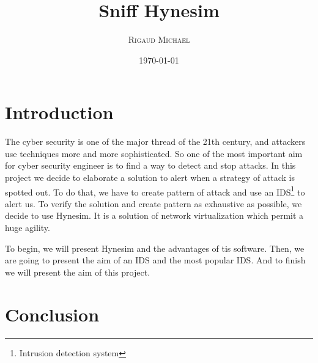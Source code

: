 \documentclass[a4paper, 11pt, oneside, oldfontcommands]{memoir}
\title{Sniff Hynesim}
\author{\textsc{Rigaud Michaël}}
\date{\today}
\newcounter{th}[chapter]
\begin{document}
\maketitle
\thispagestyle{empty}
\newpage

\tableofcontents



\chapter*{Introduction}

The cyber security is one of the major thread of the 21th century, and attackers
use techniques more and more sophisticated. So one of the most important aim for
cyber security engineer is to find a way to detect and stop attacks. In this
project we decide to elaborate a solution to alert when a strategy of attack is
spotted out. To do that, we have to create pattern of attack and use an
IDS\footnote{Intrusion detection system} to alert us. To verify the solution and
create pattern as exhaustive as possible, we decide to use Hynesim. It is a
solution of network virtualization which permit a huge agility.

To begin, we will present Hynesim and the advantages of tis software. Then, we
are going to present the aim of an IDS and the most popular IDS. And to finish
we will present the aim of this project.
\newpage







\chapter*{Conclusion}
\newpage


\appendix
\nocite{*}
%
\newpage
 \listoffigures
 \printindex
 
  
\end{document}
